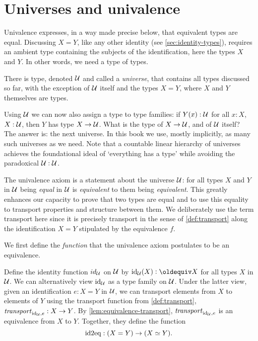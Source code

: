 \section{Universes and univalence}\label{sec:univax}

Univalence expresses, in a way made precise below, that
equivalent types are equal. Discussing $X = Y$, 
like any other identity (see \cref{sec:identity-types}),
requires an ambient type containing the subjects of the identification,
here the types $X$ and $Y$.
In other words, we need a type of types.

\begin{definition}\label{def:universe}
There is type, denoted $\mathcal{U}$ and called a \emph{universe}, that contains
all types discussed so far, with the exception of $\mathcal{U}$ itself and the types 
$X = Y$, where $X$ and $Y$ themselves are types.
\end{definition}

Using $\mathcal{U}$ we can now also assign a type to type families:
if $Y(x):\mathcal{U}$ for all $x:X$, $X:\mathcal{U}$, then $Y$ has type $X\to\mathcal{U}$.
What is the type of $X\to\mathcal{U}$, and of $\mathcal{U}$ itself?
The answer is: the next universe.
In this book we use, mostly implicitly, as many such universes as we need.
Note that a countable linear hierarchy of universes achieves
the foundational ideal of `everything has a type' while
avoiding the paradoxical $\mathcal{U}:\mathcal{U}$.

The univalence axiom is a statement about the universe $\mathcal{U}$: 
for all types $X$ and $Y$ in $\mathcal{U}$ being \emph{equal} in $\mathcal{U}$ is 
\emph{equivalent} to them being \emph{equivalent}. This greatly
enhances our capacity to prove that two types are equal
and to use this equality to transport properties and structure
between them. We deliberately use the term transport
here since it is precisely transport in the sense of
\cref{def:transport} along the identification
$X = Y$ stipulated by the equivalence $f$.

We first define the \emph{function} that
the univalence axiom postulates to be an equivalence.

\begin{definition}\label{def:idtoeq}
Define the identity function $id_{\mathcal{U}}$ on $\mathcal{U}$ by $\id_\UU(X)\defeq X$ 
for all types $X$ in $\mathcal{U}$.
We can alternatively view $\mathord{\mathrm{id}}_{\mathcal{U}}$ as a type family on $\mathcal{U}$. 
Under the latter view,
given an identification $e : X = Y$ in $\mathcal{U}$, we can
transport elements from $X$ to elements of $Y$ using the transport
function from \cref{def:transport},
$\mathord{\mathit{transport}}_{\mathord{\mathrm{id}}_{\mathcal{U}}, e} : X \to Y$.
By \cref{lem:equivalence-transport}, $\mathord{\mathit{transport}}_{\mathord{\mathrm{id}}_{\mathcal{U}}, e}$ is an 
equivalence from $X$ to $Y$. 
Together, they define the function
\[
\mathrm{id2eq} : (X = Y) \to (X\simeq Y).
\]
\end{definition}

